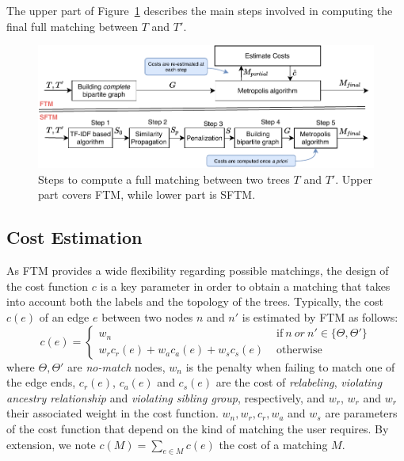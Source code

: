 The upper part of Figure~\ref{sftm:fig:steps} describes the main steps involved in computing the final full matching between $T$ and $T'$.

\begin{figure}
    \centering
	\includegraphics[width=\linewidth]{tree-matching/explanation/ftm-sftm-steps}
    \caption{Steps to compute a full matching between two trees $T$ and $T'$. Upper part covers FTM, while lower part is SFTM.}
    \label{sftm:fig:steps}
\end{figure}

\subsection{Cost Estimation}\label{sftm:sec:FTM_cost}
As FTM provides a wide flexibility regarding possible matchings, the design of the cost function $c$ is a key parameter in order to obtain a matching that takes into account both the labels and the topology of the trees.
Typically, the cost $c(e)$ of an edge $e$ between two nodes $n$ and $n'$ is estimated by FTM as follows:
\begin{equation}\label{eq:FTM_cost}
c(e) =
\begin{cases}
    w_n                                  & \text{ if}\ n\ or\ n' \in \{\Theta, \Theta'\} \\
    w_r c_r(e) + w_a c_a(e) + w_s c_s(e) & \text{ otherwise}
\end{cases}
\end{equation} 
where $\Theta, \Theta'$ are \textit{no-match} nodes, $w_n$ is the penalty when failing to match one of the edge ends, $c_r(e)$, $c_a(e)$ and $c_s(e)$ are the cost of \textit{relabeling}, \textit{violating ancestry relationship} and \textit{violating sibling group}, respectively, and $w_r$, $w_r$ and $w_r$ their associated weight in the cost function.
$w_n, w_r, c_r, w_a$ and $w_s$ are parameters of the cost function that depend on the kind of matching the user requires.
By extension, we note $c(M) = \sum_{e \in M} c(e)$ the cost of a matching $M$.

